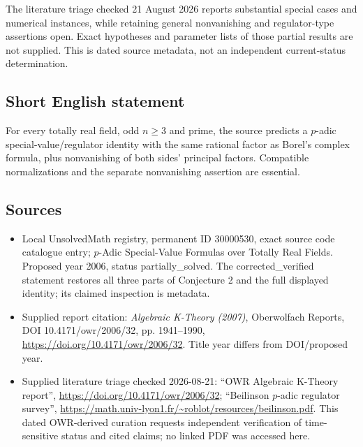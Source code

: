 \documentclass[11pt]{article}
\begin{document}
The literature triage checked 21 August 2026 reports substantial special cases and numerical instances, while retaining general nonvanishing and regulator-type assertions open. Exact hypotheses and parameter lists of those partial results are not supplied. This is dated source metadata, not an independent current-status determination.
\subsection{Short English statement}
For every totally real field, odd $n\geq3$ and prime, the source predicts a $p$-adic special-value/regulator identity with the same rational factor as Borel's complex formula, plus nonvanishing of both sides' principal factors. Compatible normalizations and the separate nonvanishing assertion are essential.
\subsection{Sources}
\begin{itemize}
\item Local UnsolvedMath registry, permanent ID 30000530, exact source code catalogue entry; $p$-Adic Special-Value Formulas over Totally Real Fields. Proposed year 2006, status partially\_solved. The corrected\_verified statement restores all three parts of Conjecture 2 and the full displayed identity; its claimed inspection is metadata.
\item Supplied report citation: \emph{Algebraic K-Theory (2007)}, Oberwolfach Reports, DOI 10.4171/owr/2006/32, pp. 1941--1990, \url{https://doi.org/10.4171/owr/2006/32}. Title year differs from DOI/proposed year.
\item Supplied literature triage checked 2026-08-21: ``OWR Algebraic K-Theory report'', \url{https://doi.org/10.4171/owr/2006/32}; ``Beilinson $p$-adic regulator survey'', \url{https://math.univ-lyon1.fr/~roblot/resources/beilinson.pdf}. This dated OWR-derived curation requests independent verification of time-sensitive status and cited claims; no linked PDF was accessed here.
\end{itemize}
\end{document}
